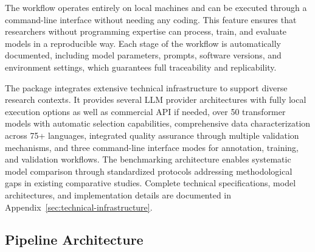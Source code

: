 \documentclass[12pt]{article}
\begin{document}
The workflow operates entirely on local machines and can be executed through a command-line interface without needing any coding. This feature ensures that researchers without programming expertise can process, train, and evaluate models in a reproducible way. Each stage of the workflow is automatically documented, including model parameters, prompts, software versions, and environment settings, which guarantees full traceability and replicability.

The package integrates extensive technical infrastructure to support diverse research contexts. It provides several LLM provider architectures with fully local execution options as well as commercial API if needed, over 50 transformer models with automatic selection capabilities, comprehensive data characterization across 75+ languages, integrated quality assurance through multiple validation mechanisms, and three command-line interface modes for annotation, training, and validation workflows. The benchmarking architecture enables systematic model comparison through standardized protocols addressing methodological gaps in existing comparative studies. Complete technical specifications, model architectures, and implementation details are documented in Appendix~\ref{sec:technical-infrastructure}.

\subsection{Pipeline Architecture}
\end{document}

